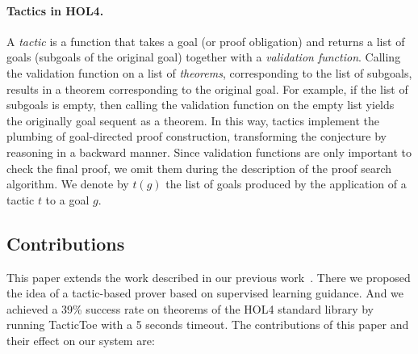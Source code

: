 \documentclass[runningheads,a4paper,draft]{svjour3}
\def\holfour{\textsf{HOL4}\xspace}
\def\tactictoe{\textsf{TacticToe}\xspace}
\begin{document}
\paragraph{Tactics in \holfour.}
A \emph{tactic} is a function
that takes a goal (or proof obligation) and returns a list of goals (subgoals
of the original goal) together
with a \textit{validation function}.
Calling the validation function on a list of \emph{theorems}, 
corresponding to
the list of subgoals, results in a theorem corresponding to the original goal.
For example, if the list of subgoals is empty, then calling the 
validation
function on the empty list yields the originally goal sequent as a theorem.
In this way, tactics implement the plumbing of goal-directed proof
construction, transforming the conjecture by reasoning in a backward manner.
Since validation functions are only important to check the final 
proof, we
omit them during the description of the proof search algorithm. We denote by
$t(g)$ the list of goals produced by the application of a tactic $t$ to a goal
$g$.

\subsection{Contributions}
This paper extends the work described in our previous work~\cite{tgckju-lpar17}.
There we proposed the idea of a tactic-based prover based on supervised
learning guidance. And we achieved a 39\% success rate on theorems of the
\holfour standard library by running \tactictoe with a 5 seconds timeout.
The contributions of this paper and their effect on our system are:
\end{document}
